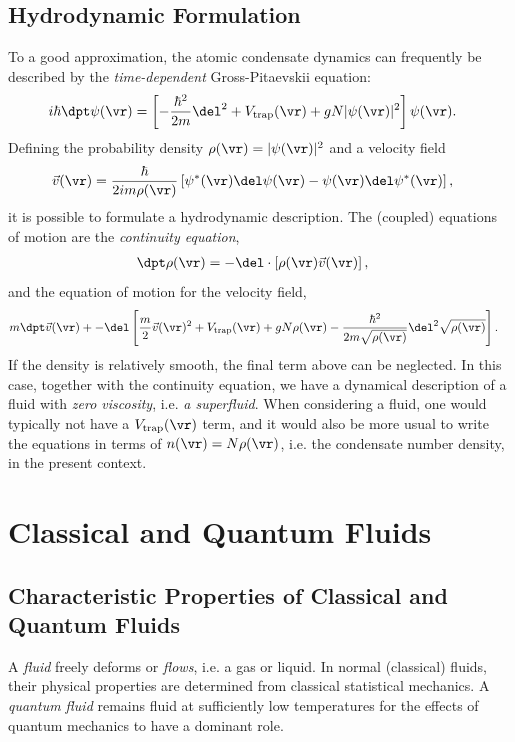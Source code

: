 \documentclass[qo.tex]{subfiles}
\begin{document}
\section{Hydrodynamic Formulation}
To a good approximation, the atomic condensate dynamics can frequently be described by the \emph{time-dependent} Gross-Pitaevskii equation:
\begin{align}
    i\hbar\dpt\psi(\vr) &= \left[-\frac{\hbar^2}{2m}\del^2 + V_{\text{trap}}(\vr) + gN|\psi(\vr)|^2\right]\psi(\vr).
\end{align}
Defining the probability density $\rho(\vr)=|\psi(\vr)|^2$ and a velocity field
\begin{align}
    \vec{v}(\vr) &= \frac{\hbar}{2im\rho(\vr)}\left[\psi^*(\vr)\del\psi(\vr) - \psi(\vr)\del\psi^*(\vr)\right],
\end{align}
it is possible to formulate a hydrodynamic description. 
The (coupled) equations of motion are the \emph{continuity equation},
\begin{align}
    \dpt\rho(\vr) &= -\del\cdot\left[\rho(\vr)\vec{v}(\vr)\right],
\end{align}
and the equation of motion for the velocity field,
\begin{align}
    m\dpt\vec{v}(\vr) &+ -\del\left[\frac{m}{2}\vec{v}(\vr)^2 + V_{\text{trap}}(\vr) + gN\rho(\vr) - \frac{\hbar^2}{2m\sqrt{\rho(\vr)}}\del^2\sqrt{\rho(\vr)}\right].
\end{align}
If the density is relatively smooth, the final term above can be neglected. 
In this case, together with the continuity equation, we have a dynamical description of a fluid with \emph{zero viscosity}, i.e. \emph{a superfluid}.
When considering a fluid, one would typically not have a $V_{\text{trap}}(\vr)$ term, and it would also be more usual to write the equations in terms of $n(\vr)=N\rho(\vr)$, i.e. the condensate number density, in the present context.

\chapter{Classical and Quantum Fluids}
\section{Characteristic Properties of Classical and Quantum Fluids}
A \emph{fluid} freely deforms or \emph{flows}, i.e. a gas or liquid. 
In normal (classical) fluids, their physical properties are determined from classical statistical mechanics.
A \emph{quantum fluid} remains fluid at sufficiently low temperatures for the effects of quantum mechanics to have a dominant role. 
\end{document}

